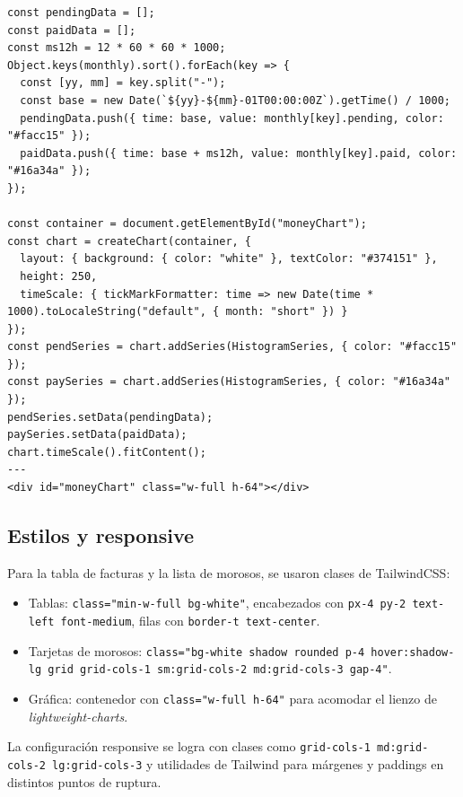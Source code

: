 \begin{large}
\begin{verbatim}
const pendingData = [];
const paidData = [];
const ms12h = 12 * 60 * 60 * 1000;
Object.keys(monthly).sort().forEach(key => {
  const [yy, mm] = key.split("-");
  const base = new Date(`${yy}-${mm}-01T00:00:00Z`).getTime() / 1000;
  pendingData.push({ time: base, value: monthly[key].pending, color: "#facc15" });
  paidData.push({ time: base + ms12h, value: monthly[key].paid, color: "#16a34a" });
});

const container = document.getElementById("moneyChart");
const chart = createChart(container, {
  layout: { background: { color: "white" }, textColor: "#374151" },
  height: 250,
  timeScale: { tickMarkFormatter: time => new Date(time * 1000).toLocaleString("default", { month: "short" }) }
});
const pendSeries = chart.addSeries(HistogramSeries, { color: "#facc15" });
const paySeries = chart.addSeries(HistogramSeries, { color: "#16a34a" });
pendSeries.setData(pendingData);
paySeries.setData(paidData);
chart.timeScale().fitContent();
---
<div id="moneyChart" class="w-full h-64"></div>
\end{verbatim}

\end{large}

\subsection{Estilos y responsive}

\begin{large}

Para la tabla de facturas y la lista de morosos, se usaron clases de TailwindCSS:

\begin{itemize}
  \item Tablas: \texttt{class="min-w-full bg-white"}, encabezados con \texttt{px-4 py-2 text-left font-medium}, filas con \texttt{border-t text-center}.
  \item Tarjetas de morosos: \texttt{class="bg-white shadow rounded p-4 hover:shadow-lg grid grid-cols-1 sm:grid-cols-2 md:grid-cols-3 gap-4"}.
  \item Gráfica: contenedor con \texttt{class="w-full h-64"} para acomodar el lienzo de \emph{lightweight-charts}.
\end{itemize}

La configuración responsive se logra con clases como \texttt{grid-cols-1 md:grid-cols-2 lg:grid-cols-3} y utilidades de Tailwind para márgenes y paddings en distintos puntos de ruptura.

\end{large}

